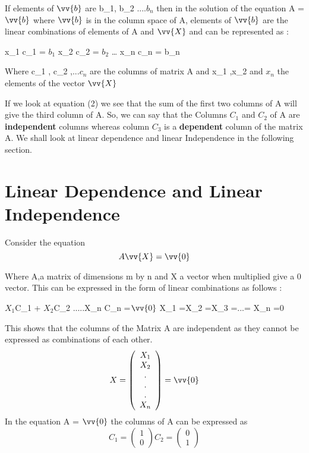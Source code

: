 \documentclass[12pt]{article}
\begin{document}
If elements of $\vv{b}$ are b_1, b_2 ....$b_n$  
then in the solution of the equation A = $\vv{b}$ where $\vv{b}$ is in the column space of A, elements of $\vv{b}$ are the linear combinations of elements of A and $\vv{X}$ and can be represented as :
\begin{center}
       x_1 c_1 = $b_1$
\newline x_2 c_2 = $b_2$
\newline \dots
x_n c_n = b_n
\end{center}
      
Where c_1 , c_2 ,...$c_n$ are the columns of matrix A and x_1 ,x_2 and $x_n$ the elements of the vector $\vv{X}$

If we look at equation (2) we see that the sum of the first two columns of A will give the third column of A. So, we can say that the Columns $C_1$ and $C_2$ of A are \textbf{independent} columns whereas column $C_3$ is a \textbf{dependent} column of the matrix A.
We shall look at linear dependence and linear Independence in the following section. 



\section{Linear Dependence and Linear Independence}
Consider the equation 
\begin{equation}
    A\vv{X} = \vv{0}
\end{equation}



Where A,a matrix of dimensions m by n and X a vector when multiplied give a 0 vector.
This can be expressed in the form of  linear combinations as follows :
\begin{center}
    $X_1$C_1 + $X_2$C_2 .....X_n C_n =$\vv{0}$
   \linebreaK
   \implies X_1 =X_2 =X_3 =...= X_n =0
\end{center}
This shows that the columns of the Matrix A are independent as they cannot be expressed as combinations of each other.
\begin{equation}
   X = \left({\begin{array}{c} X_1\\X_2\\ . \\. \\.\\X_n\end{array}}\right) = \vv{0}
\end{equation}
 In the equation A = $\vv{0}$ the columns of A can be expressed as
 \begin{equation}
     C_1 = \left({\begin{array}{c} 1\\0\end{array}}\right) 
     C_2 = \left({\begin{array}{c} 0\\1\end{array}}\right)
 \end{equation}
 \linebreaK 
 
\end{document}
